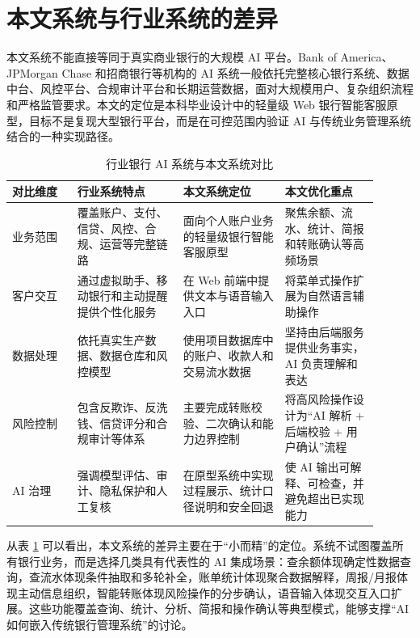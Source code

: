 \documentclass[bachelor, print]{xduthesis}
\begin{document}
\section{本文系统与行业系统的差异}

本文系统不能直接等同于真实商业银行的大规模 AI 平台。Bank of America、JPMorgan Chase 和招商银行等机构的 AI 系统一般依托完整核心银行系统、数据中台、风控平台、合规审计平台和长期运营数据，面对大规模用户、复杂组织流程和严格监管要求。本文的定位是本科毕业设计中的轻量级 Web 银行智能客服原型，目标不是复现大型银行平台，而是在可控范围内验证 AI 与传统业务管理系统结合的一种实现路径。

\begin{table}[H]
    \centering
    \caption{行业银行 AI 系统与本文系统对比}
    \label{tab:industry-system-compare}
    \begin{tabular}{|p{0.16\linewidth}|p{0.26\linewidth}|p{0.25\linewidth}|p{0.23\linewidth}|}
        \hline
        对比维度 & 行业系统特点 & 本文系统定位 & 本文优化重点 \\
        \hline
        业务范围 & 覆盖账户、支付、信贷、风控、合规、运营等完整链路 & 面向个人账户业务的轻量级银行智能客服原型 & 聚焦余额、流水、统计、简报和转账确认等高频场景 \\
        \hline
        客户交互 & 通过虚拟助手、移动银行和主动提醒提供个性化服务 & 在 Web 前端中提供文本与语音输入入口 & 将菜单式操作扩展为自然语言辅助操作 \\
        \hline
        数据处理 & 依托真实生产数据、数据仓库和风控模型 & 使用项目数据库中的账户、收款人和交易流水数据 & 坚持由后端服务提供业务事实，AI 负责理解和表达 \\
        \hline
        风险控制 & 包含反欺诈、反洗钱、信贷评分和合规审计等体系 & 主要完成转账校验、二次确认和能力边界控制 & 将高风险操作设计为“AI 解析 + 后端校验 + 用户确认”流程 \\
        \hline
        AI 治理 & 强调模型评估、审计、隐私保护和人工复核 & 在原型系统中实现过程展示、统计口径说明和安全回退 & 使 AI 输出可解释、可检查，并避免超出已实现能力 \\
        \hline
    \end{tabular}
\end{table}

从表 \ref{tab:industry-system-compare} 可以看出，本文系统的差异主要在于“小而精”的定位。系统不试图覆盖所有银行业务，而是选择几类具有代表性的 AI 集成场景：查余额体现确定性数据查询，查流水体现条件抽取和多轮补全，账单统计体现聚合数据解释，周报/月报体现主动信息组织，智能转账体现风险操作的分步确认，语音输入体现交互入口扩展。这些功能覆盖查询、统计、分析、简报和操作确认等典型模式，能够支撑“AI 如何嵌入传统银行管理系统”的讨论。
\end{document}
